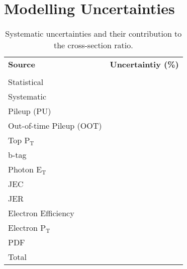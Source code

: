 \section{Modelling Uncertainties} \label{sec-ModellingUncertainties}

\begin{table}[h!] \label{tab-systuncerts}
\centering
\begin{tabular}{|l|c|c|}
\hline
\textbf{Source} & \multicolumn{2}{c|}{\textbf{Uncertaintiy (\%)}} \\ \cline{2-3}
 &  & \\
\hline
Statistical & & \\
\hline
Systematic & & \\
\hline
Pileup (PU) & & \\
Out-of-time Pileup (OOT) & & \\
Top P$_{\text{T}}$ & & \\
b-tag & & \\
Photon E$_{\text{T}}$ & & \\
JEC & & \\
JER & & \\
Electron Efficiency & & \\
Electron P$_{\text{T}}$ & & \\
PDF & & \\
\hline
Total & & \\
\hline
\end{tabular} 
\caption{Systematic uncertainties and their contribution to the cross-section ratio.}
\end{table}

